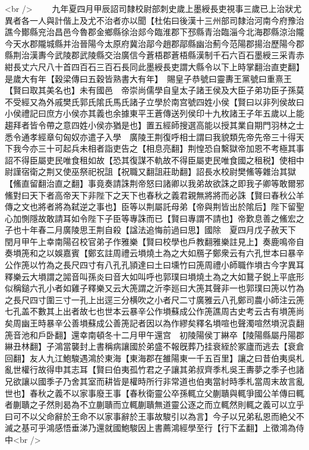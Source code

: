 <br />
　　九年夏四月甲辰詔司隸校尉部刺史歲上墨綬長吏視事三歲已上治狀尤異者各一人與計偕上及尤不治者亦以聞【杜佑曰後漢十三州部司隸治河南今府豫治譙今鄼縣兖治昌邑今魯郡金鄉縣徐治郯今臨淮郡下邳縣青治臨淄今北海郡縣涼治隴今天水郡隴城縣并治晉陽今太原府冀治鄗今趙郡鄗縣幽治薊今范陽郡揚治歷陽今郡縣荆治漢夀今武陵郡武陵縣交治廣信今蒼梧郡蒼梧縣漢制千石六百石墨綬三采青赤紺長丈六尺八十首四百石三百石長同此墨綬長吏謂大縣令以下上時掌翻治直吏翻】　是歲大有年【穀梁傳曰五穀皆熟書大有年】　賜皇子恭號曰靈夀王黨號曰重熹王【賢曰取其美名也】未有國邑　帝崇尚儒學自皇太子諸王侯及大臣子弟功臣子孫莫不受經又為外戚樊氏郭氏隂氏馬氏諸子立學於南宫號四姓小侯【賢曰以非列侯故曰小侯禮記曰庶方小侯亦其義也余據東平王蒼傳送列侯印十九枚諸王子年五歲以上能趨拜者皆令帶之意四姓小侯亦猶是也】置五經師搜選高能以授其業自期門羽林之士悉令通孝經章句匈奴亦遣子入學　廣陵王荆復呼相士謂曰我貌類先帝先帝三十得天下我今亦三十可起兵未相者詣吏告之【相息亮翻】荆惶恐自繫獄帝加恩不考極其事詔不得臣屬吏民唯食租如故【恐其復謀不軌故不得臣屬吏民唯食國之租税】使相中尉謹宿衛之荆又使巫祭祀祝詛【祝職又翻詛莊助翻】詔長水校尉樊鯈等雜治其獄【鯈直留翻治直之翻】事竟奏請誅荆帝怒曰諸卿以我弟故欲誅之即我子卿等敢爾邪鯈對曰天下者高帝天下非陛下之天下也春秋之義君親無將將而必誅【賢曰春秋公羊傳之文也將者將為弑逆之事也】臣等以荆屬託母弟【帝與荆皆出於隂后】陛下留聖心加惻隱故敢請耳如令陛下子臣等專誅而已【賢曰專謂不請也】帝歎息善之鯈宏之子也十年春二月廣陵思王荆自殺【諡法追悔前過曰思】國除　夏四月戊子赦天下　閏月甲午上幸南陽召校官弟子作雅樂【賢曰校學也戶教翻雅樂註見上】奏鹿鳴帝自奏塤箎和之以娛嘉賓【鄭玄註周禮云塤燒土為之大如鴈子鄭衆云有六孔世本曰暴辛公作箎以竹為之長尺四寸有八孔孔頴達曰土曰壎竹曰箎周禮小師職作塤古今字異耳釋樂云大塤謂之嘂音叫孫炎曰音大如叫呼也郭璞曰塤燒土為之大如鵞子鋭上平底形似稱鎚六孔小者如雞子釋樂又云大箎謂之沂李廵曰大箎其聲非一也郭璞曰箎以竹為之長尺四寸圍三寸一孔上出逕三分横吹之小者尺二寸廣雅云八孔鄭司農小師注云箎七孔盖不數其上出者故七也世本云暴辛公作塤蘇成公作箎譙周古史考云古有塤箎尚矣周幽王時暴辛公善塤蘇成公善箎記者因以為作繆矣釋名塤喧也聲濁喧然塤況袁翻箎音池和戶卧翻】還幸南頓冬十二月甲午還宫　初陵陽侯丁綝卒【陵陽縣屬丹陽郡綝丑林翻】子鴻當襲封上書稱病讓國於弟盛不報旣葬乃挂衰絰於冢廬而逃去【衰倉回翻】友人九江鮑駿遇鴻於東海【東海郡在雒陽東一千五百里】讓之曰昔伯夷吳札亂世權行故得申其志耳【賢曰伯夷孤竹君之子讓其弟叔齊季札吳王夀夢之季子也諸兄欲讓以國季子乃舍其室而耕皆是權時所行非常道也伯夷當紂時季札當周末故言亂世也】春秋之義不以家事廢王事【春秋衛靈公卒孫輒立父蒯聵與輒爭國公羊傳曰輒者蒯聵之子然則曷為不立蒯聵而立輒蒯聵無道靈公逐之而立輒然則輒之義可以立乎曰可不以父命辭於王命不以家事辭於王事故駿引以為言】今子以兄弟私恩而絶父不滅之基可乎鴻感悟垂涕乃還就國鮑駿因上書薦鴻經學至行【行下孟翻】上徵鴻為侍中<br />
